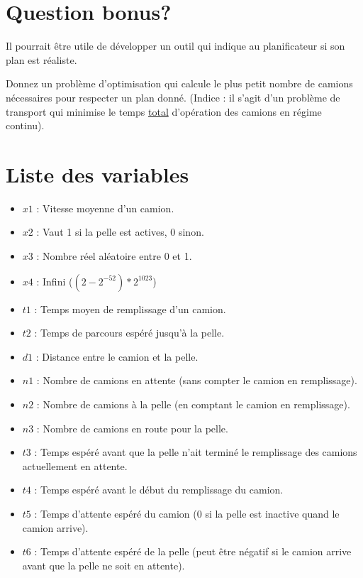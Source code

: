 \documentclass[letterpaper,12pt]{article}
\begin{document}
	
	\section*{Question bonus?}
	Il pourrait être utile de développer un outil qui indique au planificateur si son plan est réaliste.
	
	Donnez un problème d'optimisation qui calcule le plus petit nombre de camions nécessaires pour respecter un plan donné. (Indice : il s'agit d'un problème de transport qui minimise le temps \underline{total} d'opération des camions en régime continu).
	
	
	\section{Liste des variables}
	\label{sec:vars}
	
	
	\begin{itemize}
		\setlength\itemsep{0.01em}
		\item $x1$ : Vitesse moyenne d'un camion.
		\item $x2$ : Vaut 1 si la pelle est actives, 0 sinon.
		\item $x3$ : Nombre réel aléatoire entre 0 et 1.
		\item $x4$ : Infini ($(2-2^{-52})*2^{1023}$)
		\item $t1$ : Temps moyen de remplissage d'un camion.
		\item $t2$ : Temps de parcours espéré jusqu'à la pelle.  
		\item $d1$ : Distance entre le camion et la pelle.
		\item $n1$ : Nombre de camions en attente (sans compter le camion en remplissage).
		\item $n2$ : Nombre de camions à la pelle (en comptant le camion en remplissage).
		\item $n3$ : Nombre de camions en route pour la pelle.
		\item $t3$ : Temps espéré avant que la pelle n'ait terminé le remplissage des camions actuellement en attente.
		\item $t4$ : Temps espéré avant le début du remplissage du camion.
		\item $t5$ : Temps d'attente espéré du camion (0 si la pelle est inactive quand le camion arrive).
		\item $t6$ : Temps d'attente espéré de la pelle (peut être négatif si le camion arrive avant que la pelle ne soit en attente).
	\end{itemize}
	
	
	
\end{document}
